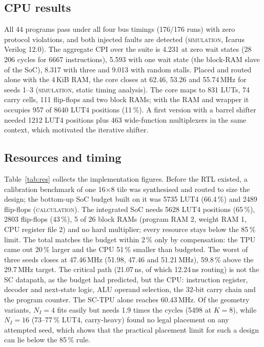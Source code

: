 \documentclass[conference]{IEEEtran}
\newcommand{\IL}{N_{I}}              %
\newcommand{\lbl}[1]{\textsc{#1}}    %
\begin{document}
\subsection{CPU results}
All 44 programs pass under all four bus timings (176/176 runs) with zero
protocol violations, and both injected faults are detected
(\lbl{simulation}, Icarus Verilog 12.0). The aggregate CPI over the suite is
4.231 at zero wait states (28\,206 cycles for 6667 instructions), 5.593 with
one wait state (the block-RAM slave of the SoC), 8.317 with three and 9.013
with random stalls. Placed and routed alone with the 4\,KiB RAM, the core
closes at 62.46, 53.26 and 55.74\,MHz for seeds 1--3 (\lbl{simulation},
static timing analysis). The core maps to 831 LUTs, 74 carry cells, 111
flip-flops and two block RAMs; with the RAM and wrapper it occupies 957 of
8640 LUT4 positions (11\,\%). A first version with a barrel shifter needed
1212 LUT4 positions plus 463 wide-function multiplexers in the same context,
which motivated the iterative shifter.

\subsection{Resources and timing}
Table~\ref{tab:res} collects the implementation figures. Before the RTL
existed, a calibration benchmark of one 16$\times$8 tile was synthesised and
routed to size the design; the bottom-up SoC budget built on it was 5735 LUT4
(66.4\,\%) and 2489 flip-flops (\lbl{calculation}).
The integrated SoC needs 5628 LUT4 positions (65\,\%), 2803 flip-flops
(43\,\%), 5 of 26 block RAMs (program RAM 2, weight RAM 1, CPU register file
2) and no hard multiplier; every resource stays below the 85\,\% limit. The
total matches the budget within 2\,\% only by compensation: the TPU came out
20\,\% larger and the CPU 51\,\% smaller than budgeted.
The worst of three seeds closes at 47.46\,MHz (51.98, 47.46 and 51.21\,MHz),
59.8\,\% above the 29.7\,MHz target. The critical path (21.07\,ns, of which
12.24\,ns routing) is not the SC datapath, as the budget had predicted, but
the CPU: instruction register, decoder and next-state logic, ALU operand
selection, the 32-bit carry chain and the program counter. The SC-TPU alone
reaches 60.43\,MHz.
Of the geometry variants, $\IL=4$ fits easily but needs 1.9 times the cycles (5498 at $K=8$), while
$\IL=16$ (73--77\,\% LUT4, carry-heavy) found no legal placement on any
attempted seed, which shows that the practical placement limit for such a
design can lie below the 85\,\% rule.
\end{document}
